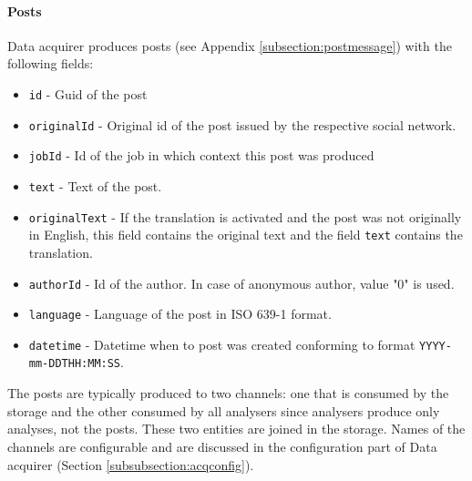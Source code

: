 \paragraph{Posts}

Data acquirer produces posts (see Appendix \ref{subsection:postmessage})  with the following fields:

\begin{itemize}
    \item \texttt{id} - Guid of the post
    \item \texttt{originalId} - Original id of the post issued by the respective social network.
    \item \texttt{jobId} - Id of the job in which context this post was produced
    \item \texttt{text} - Text of the post.
    \item \texttt{originalText} - If the translation is activated and the post was not originally in English, this field contains the original text and the field \texttt{text} contains the translation.
    \item \texttt{authorId} - Id of the author. In case of anonymous author,  value "0" is used.
    \item \texttt{language} - Language of the post in ISO 639-1 format.
    \item \texttt{datetime} - Datetime when to post was created conforming to format \texttt{YYYY-mm-DDTHH:MM:SS}.
\end{itemize}

The posts are typically produced to two channels: one that is consumed by the storage and the other consumed by all analysers since analysers produce only analyses, not the posts. These two entities are joined in the storage. Names of the channels are configurable and are discussed in the configuration part of Data acquirer (Section \ref{subsubsection:acqconfig}).

